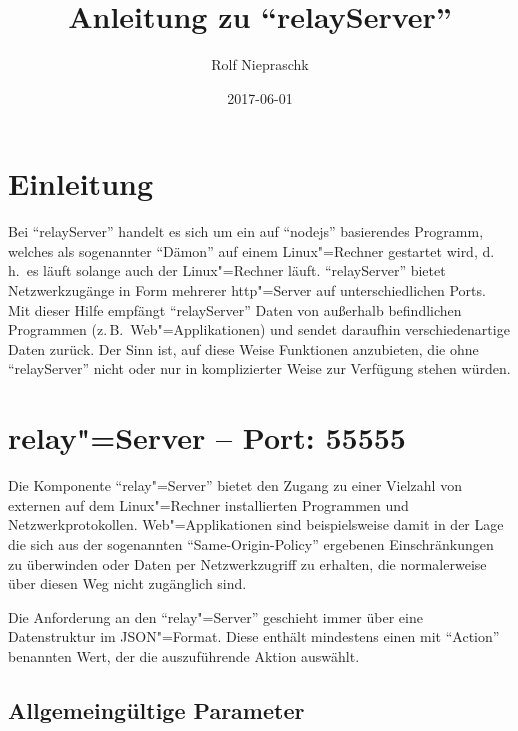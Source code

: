 \documentclass[titlepage=false,toc=nobibliography]{vl-report}
\newcommand*\theServer{relayServer}
\begin{document}
\subject{PTB~--~AG~7.54}
\title{Anleitung zu "`\theServer"'}
\date{2017-06-01}
\author{Rolf Niepraschk}

\maketitle

\section*{Einleitung}

Bei "`\theServer"' handelt es sich um ein auf "`nodejs"' basierendes
Programm, welches als sogenannter "`Dämon"' auf einem Linux"=Rechner
gestartet wird, d.\,h.\ es läuft solange auch der Linux"=Rechner läuft.
"`\theServer"' bietet Netzwerkzugänge in Form mehrerer
http"=Server auf unterschiedlichen Ports. Mit dieser Hilfe empfängt
"`\theServer"' Daten von außerhalb befindlichen Programmen (z.\,B.\
Web"=Applikationen) und sendet daraufhin verschiedenartige Daten zurück. Der
Sinn ist, auf diese Weise Funktionen anzubieten, die ohne "`\theServer"'
nicht oder nur in komplizierter Weise zur Verfügung stehen würden.

\section{relay"=Server -- Port: 55555}

Die Komponente "`relay"=Server"' bietet den Zugang zu einer Vielzahl von
externen auf dem Linux"=Rechner installierten Programmen und
Netzwerkprotokollen. Web"=Applikationen sind beispielsweise damit in der Lage
die sich aus der sogenannten "`Same-Origin-Policy"' ergebenen
Einschränkungen zu überwinden oder Daten per Netzwerkzugriff zu erhalten,
die normalerweise über diesen Weg nicht zugänglich sind.

Die Anforderung an den "`relay"=Server"' geschieht immer über eine
Datenstruktur im JSON"=Format. Diese enthält mindestens einen mit "`Action"'
benannten Wert, der die auszuführende Aktion auswählt.

\subsection{Allgemeingültige Parameter}
\end{document}
